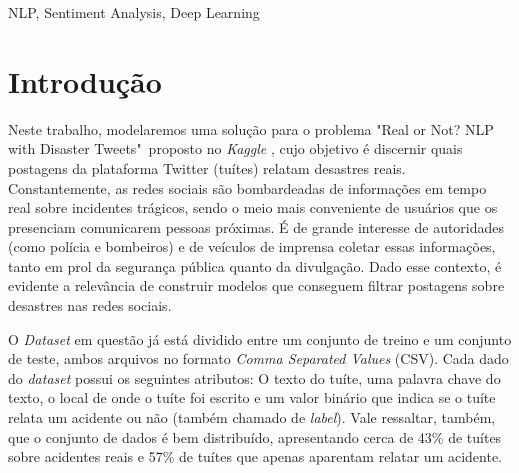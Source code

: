 \documentclass[twoside,conference,a4paper]{IEEEtran}
\begin{document}
\begin{IEEEkeywords}
 NLP, Sentiment Analysis, Deep Learning
\end{IEEEkeywords}


\section{Introdução}


Neste trabalho, modelaremos uma solução para o problema "Real or Not? NLP with Disaster Tweets"~proposto no \textit{Kaggle} \cite{kaggle_nlp}, cujo objetivo é discernir quais postagens da plataforma Twitter (tuítes) relatam desastres reais. Constantemente, as redes sociais são bombardeadas de informações em tempo real sobre incidentes trágicos, sendo o meio mais conveniente de usuários que os presenciam comunicarem pessoas próximas. É de grande interesse de autoridades (como polícia e bombeiros) e de veículos de imprensa coletar essas informações, tanto em prol da segurança pública quanto da divulgação. Dado esse contexto, é evidente a relevância de construir modelos que conseguem filtrar postagens sobre desastres nas redes sociais.

O \textit{Dataset} em questão já está dividido entre um conjunto de treino e um conjunto de teste, ambos arquivos no formato \textit{Comma Separated Values} (CSV). Cada dado do \textit{dataset} possui os seguintes atributos: O texto do tuíte, uma palavra chave do texto, o local de onde o tuíte foi escrito e um valor binário que indica se o tuíte relata um acidente ou não (também chamado de \textit{label}). Vale ressaltar, também, que o conjunto de dados é bem distribuído, apresentando cerca de 43\% de tuítes sobre acidentes reais e 57\% de tuítes que apenas aparentam relatar um acidente.
\end{document}
